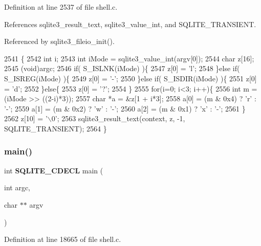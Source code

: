 Definition at line 2537 of file shell.\+c.



References sqlite3\+\_\+result\+\_\+text, sqlite3\+\_\+value\+\_\+int, and S\+Q\+L\+I\+T\+E\+\_\+\+T\+R\+A\+N\+S\+I\+E\+NT.



Referenced by sqlite3\+\_\+fileio\+\_\+init().


\begin{DoxyCode}
2541  \{
2542   \textcolor{keywordtype}{int} i;
2543   \textcolor{keywordtype}{int} iMode = sqlite3_value_int(argv[0]);
2544   \textcolor{keywordtype}{char} z[16];
2545   (void)argc;
2546   \textcolor{keywordflow}{if}( S\_ISLNK(iMode) )\{
2547     z[0] = \textcolor{charliteral}{'l'};
2548   \}\textcolor{keywordflow}{else} \textcolor{keywordflow}{if}( S\_ISREG(iMode) )\{
2549     z[0] = \textcolor{charliteral}{'-'};
2550   \}\textcolor{keywordflow}{else} \textcolor{keywordflow}{if}( S\_ISDIR(iMode) )\{
2551     z[0] = \textcolor{charliteral}{'d'};
2552   \}\textcolor{keywordflow}{else}\{
2553     z[0] = \textcolor{charliteral}{'?'};
2554   \}
2555   \textcolor{keywordflow}{for}(i=0; i<3; i++)\{
2556     \textcolor{keywordtype}{int} m = (iMode >> ((2-i)*3));
2557     \textcolor{keywordtype}{char} *a = &z[1 + i*3];
2558     a[0] = (m & 0x4) ? \textcolor{charliteral}{'r'} : \textcolor{charliteral}{'-'};
2559     a[1] = (m & 0x2) ? \textcolor{charliteral}{'w'} : \textcolor{charliteral}{'-'};
2560     a[2] = (m & 0x1) ? \textcolor{charliteral}{'x'} : \textcolor{charliteral}{'-'};
2561   \}
2562   z[10] = \textcolor{charliteral}{'\(\backslash\)0'};
2563   sqlite3_result_text(context, z, -1, SQLITE_TRANSIENT);
2564 \}
\end{DoxyCode}
\mbox{\label{shell_8c_ac931daf5abf20567dcdd053c22142b95}} 
\subsubsection{main()}
{\footnotesize\ttfamily int \textbf{ S\+Q\+L\+I\+T\+E\+\_\+\+C\+D\+E\+CL} main (\begin{DoxyParamCaption}\item[{int}]{argc,  }\item[{char $\ast$$\ast$}]{argv }\end{DoxyParamCaption})}



Definition at line 18665 of file shell.\+c.



